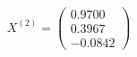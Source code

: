 \documentclass[preview]{standalone}
\begin{document}
\begin{align*}
X^{(2)} = \begin{pmatrix} 0.9700 \\ 0.3967 \\ -0.0842 \end{pmatrix}
\end{align*}
\end{document}
